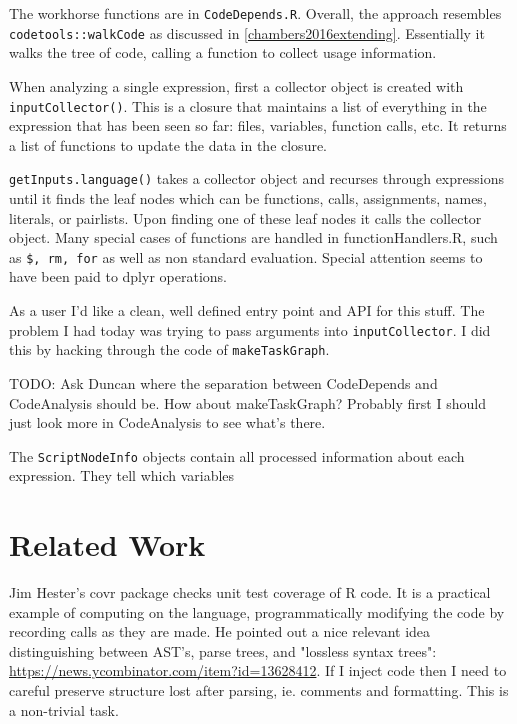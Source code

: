 \documentclass[12pt]{article}
\begin{document}
The workhorse functions are in \texttt{CodeDepends.R}. Overall, the
approach resembles \texttt{codetools::walkCode} as discussed in
\ref{chambers2016extending}. Essentially it walks the tree of code, calling
a function to collect usage information.

When analyzing a single expression, first a 
collector object is created with \texttt{inputCollector()}. This is a
closure that maintains a list of everything in the expression that has been seen
so far: files, variables, function calls, etc. It returns a list of
functions to update the data in the closure.

\texttt{getInputs.language()} takes a collector object and
recurses through expressions until it finds the leaf nodes which can be functions, calls, assignments,
names, literals, or pairlists. Upon finding one of these leaf nodes it
calls the collector object. 
Many special cases of functions are handled in functionHandlers.R, such as
\texttt{\$, rm, for} as well as non standard evaluation. Special attention seems
to have been paid to dplyr operations.

As a user I'd like a clean, well defined entry point and API for this
stuff. The problem I had today was trying to pass arguments into
\texttt{inputCollector}. I did this by hacking through the code of
\texttt{makeTaskGraph}.

TODO: Ask Duncan where the separation between CodeDepends and CodeAnalysis
should be. How about makeTaskGraph? Probably first I should just look more
in CodeAnalysis to see what's there.

The \texttt{ScriptNodeInfo} objects contain all processed information about
each expression. They tell which variables 

\section{Related Work}

Jim Hester's covr package \cite{R-covr} checks unit test coverage of R
code. It is a practical example of computing on the language,
programmatically modifying the code by recording calls as they are made.
He pointed out a nice relevant idea distinguishing between AST's, parse
trees, and "lossless syntax trees":
\url{https://news.ycombinator.com/item?id=13628412}. If I inject code then
I need to careful preserve structure lost after parsing, ie.
comments and formatting. This is a non-trivial task.
\end{document}
